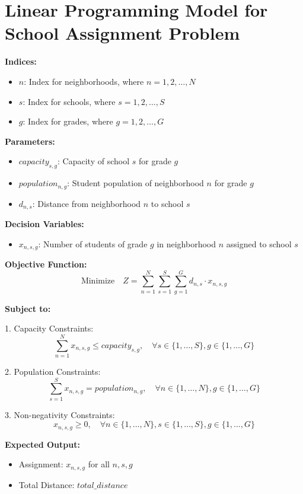 \documentclass{article}
\begin{document}
\section*{Linear Programming Model for School Assignment Problem}

\textbf{Indices:}
\begin{itemize}
    \item $n$: Index for neighborhoods, where $n = 1, 2, \ldots, N$
    \item $s$: Index for schools, where $s = 1, 2, \ldots, S$
    \item $g$: Index for grades, where $g = 1, 2, \ldots, G$
\end{itemize}

\textbf{Parameters:}
\begin{itemize}
    \item $capacity_{s,g}$: Capacity of school $s$ for grade $g$
    \item $population_{n,g}$: Student population of neighborhood $n$ for grade $g$
    \item $d_{n,s}$: Distance from neighborhood $n$ to school $s$
\end{itemize}

\textbf{Decision Variables:}
\begin{itemize}
    \item $x_{n,s,g}$: Number of students of grade $g$ in neighborhood $n$ assigned to school $s$
\end{itemize}

\textbf{Objective Function:}
\[
\text{Minimize} \quad Z = \sum_{n=1}^{N} \sum_{s=1}^{S} \sum_{g=1}^{G} d_{n,s} \cdot x_{n,s,g}
\]

\textbf{Subject to:}

1. Capacity Constraints:
\[
\sum_{n=1}^{N} x_{n,s,g} \leq capacity_{s,g}, \quad \forall s \in \{1, \ldots, S\}, g \in \{1, \ldots, G\}
\]

2. Population Constraints:
\[
\sum_{s=1}^{S} x_{n,s,g} = population_{n,g}, \quad \forall n \in \{1, \ldots, N\}, g \in \{1, \ldots, G\}
\]

3. Non-negativity Constraints:
\[
x_{n,s,g} \geq 0, \quad \forall n \in \{1, \ldots, N\}, s \in \{1, \ldots, S\}, g \in \{1, \ldots, G\}
\]

\textbf{Expected Output:}
\begin{itemize}
    \item Assignment: $x_{n,s,g}$ for all $n, s, g$
    \item Total Distance: $total\_distance$
\end{itemize}
\end{document}
